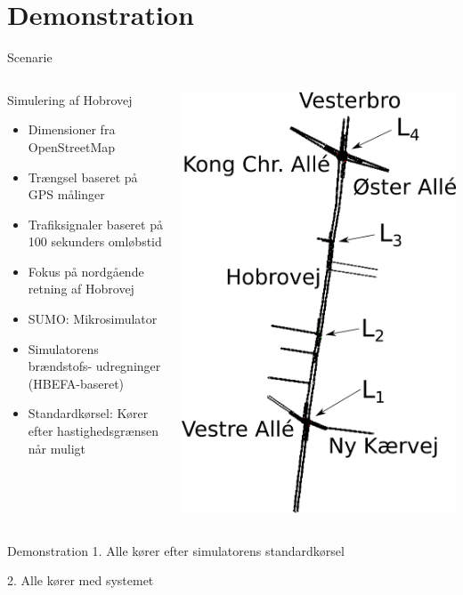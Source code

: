 \section{Demonstration}
\begin{frame}{Scenarie}
\begin{columns}
\begin{column}{0.6\textwidth}
Simulering af Hobrovej
\begin{itemize}
\item Dimensioner fra OpenStreetMap
\item Trængsel baseret på GPS målinger
\item Trafiksignaler baseret på 100 sekunders omløbstid
\item Fokus på nordgående retning af Hobrovej
\item SUMO: Mikrosimulator
\item Simulatorens brændstofs- udregninger (HBEFA-baseret)
\item Standardkørsel: Kører efter hastighedsgrænsen når muligt
\end{itemize}
\end{column}

\begin{column}{0.4\textwidth}
\includegraphics[width=1\textwidth]{images/Hobrovej.png}
\end{column}
\end{columns}
\end{frame}

\begin{frame}{Demonstration}
1. Alle kører efter simulatorens standardkørsel
\vspace{4mm}

2. Alle kører med systemet
\end{frame}